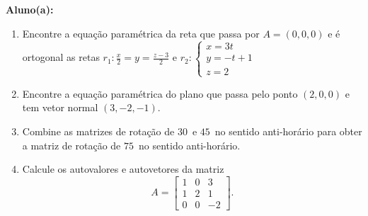 \documentclass[a4paper,5pt]{amsbook}
\newcommand{\ds}{\displaystyle}
\begin{document}
\vspace{0.5cm}
{\bf Aluno(a):}\dotfill{}  %

\vspace{0.2cm}
\begin{enumerate}
	\vspace{0.5cm}
	\item Encontre a equa\c{c}\~ao param\'etrica da reta que passa por $A = (0,0,0)$ e
		\'e ortogonal as retas $\ds r_1: \frac{x}{2} = y = \frac{z-3}{2}$ e
		$r_2: \left\{\begin{array}{lll}
				x = 3t \\
				y = -t + 1 \\
				z = 2
			\end{array}\right.$

	\vspace{0.5cm}
	\item Encontre a equa\c{c}\~ao param\'etrica do plano que passa pelo ponto
		$(2, 0, 0)$ e tem vetor normal $(3, -2, -1)$.

	\vspace{0.5cm}
	\item Combine as matrizes de rota\c{c}\~ao de $30$\textdegree\ e $45$\textdegree\ no
		sentido anti-hor\'ario para obter a matriz de rota\c{c}\~ao de $75$\textdegree\ no
		sentido anti-hor\'ario.

	\vspace{0.5cm}
	\item Calcule os autovalores e autovetores da matriz
		\[A = \left[\begin{array}{rrr}
			1 & 0 & 3 \\
			1 & 2 & 1 \\
			0 & 0 & -2
		\end{array}\right].\]


\end{enumerate}
\end{document}
